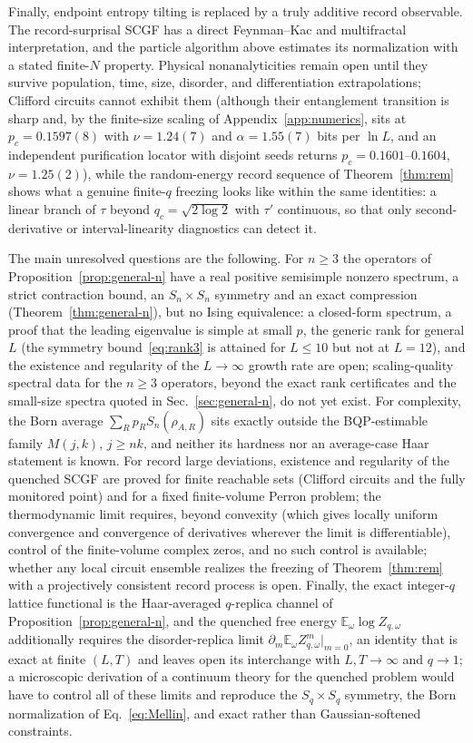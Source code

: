 \documentclass[aps,prx,reprint,superscriptaddress,nobibnotes,longbibliography]{revtex4-2}
\theoremstyle{remark}
\newcommand{\E}{\mathbb E}
\begin{document}
Finally, endpoint entropy tilting is replaced by a truly additive record observable.  The record-surprisal SCGF has a direct Feynman--Kac and multifractal interpretation, and the particle algorithm above estimates its normalization with a stated finite-$N$ property.  Physical nonanalyticities remain open until they survive population, time, size, disorder, and differentiation extrapolations; Clifford circuits cannot exhibit them (although their entanglement transition is sharp and, by the finite-size scaling of Appendix~\ref{app:numerics}, sits at $p_c=0.1597(8)$ with $\nu=1.24(7)$ and $\alpha=1.55(7)$ bits per $\ln L$, and an independent purification locator with disjoint seeds returns $p_c=0.1601$--$0.1604$, $\nu=1.25(2)$), while the random-energy record sequence of Theorem~\ref{thm:rem} shows what a genuine finite-$q$ freezing looks like within the same identities: a linear branch of $\tau$ beyond $q_c=\sqrt{2\log2}$ with $\tau'$ continuous, so that only second-derivative or interval-linearity diagnostics can detect it.

The main unresolved questions are the following.  For $n\ge3$ the operators of Proposition~\ref{prop:general-n} have a real positive semisimple nonzero spectrum, a strict contraction bound, an $S_n\times S_n$ symmetry and an exact compression (Theorem~\ref{thm:general-n}), but no Ising equivalence: a closed-form spectrum, a proof that the leading eigenvalue is simple at small $p$, the generic rank for general $L$ (the symmetry bound~\eqref{eq:rank3} is attained for $L\le10$ but not at $L=12$), and the existence and regularity of the $L\to\infty$ growth rate are open; scaling-quality spectral data for the $n\ge3$ operators, beyond the exact rank certificates and the small-size spectra quoted in Sec.~\ref{sec:general-n}, do not yet exist.  For complexity, the Born average $\sum_Rp_RS_n(\rho_{A,R})$ sits exactly outside the BQP-estimable family $M(j,k)$, $j\ge nk$, and neither its hardness nor an average-case Haar statement is known.  For record large deviations, existence and regularity of the quenched SCGF are proved for finite reachable sets (Clifford circuits and the fully monitored point) and for a fixed finite-volume Perron problem; the thermodynamic limit requires, beyond convexity (which gives locally uniform convergence and convergence of derivatives wherever the limit is differentiable), control of the finite-volume complex zeros, and no such control is available; whether any local circuit ensemble realizes the freezing of Theorem~\ref{thm:rem} with a projectively consistent record process is open.  Finally, the exact integer-$q$ lattice functional is the Haar-averaged $q$-replica channel of Proposition~\ref{prop:general-n}, and the quenched free energy $\E_\omega\log Z_{q,\omega}$ additionally requires the disorder-replica limit $\partial_m\E_\omega Z_{q,\omega}^m|_{m=0}$, an identity that is exact at finite $(L,T)$ and leaves open its interchange with $L,T\to\infty$ and $q\to1$; a microscopic derivation of a continuum theory for the quenched problem would have to control all of these limits and reproduce the $S_q\times S_q$ symmetry, the Born normalization of Eq.~\eqref{eq:Mellin}, and exact rather than Gaussian-softened constraints.
\end{document}
